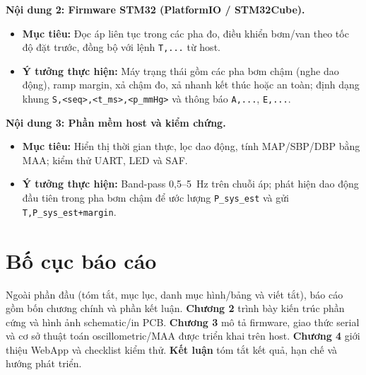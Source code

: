 \noindent\textbf{Nội dung 2: Firmware STM32 (PlatformIO / STM32Cube).}\\
\vspace{-0.6cm}
\begin{itemize}\itemsep0pt \parskip0pt 
	\item \textbf{Mục tiêu:} Đọc áp liên tục trong các pha đo, điều khiển bơm/van theo tốc độ đặt trước, đồng bộ với lệnh \texttt{T,...} từ host.
	\item \textbf{Ý tưởng thực hiện:} Máy trạng thái gồm các pha bơm chậm (nghe dao động), ramp margin, xả chậm đo, xả nhanh kết thúc hoặc an toàn; định dạng khung \texttt{S,<seq>,<t\_ms>,<p\_mmHg>} và thông báo \texttt{A,...}, \texttt{E,...}.
\end{itemize}
\vspace{-0.2cm}

\noindent\textbf{Nội dung 3: Phần mềm host và kiểm chứng.}\\
\vspace{-0.6cm}
\begin{itemize}\itemsep0pt \parskip0pt 
	\item \textbf{Mục tiêu:} Hiển thị thời gian thực, lọc dao động, tính MAP/SBP/DBP bằng MAA; kiểm thử UART, LED và SAF.
	\item \textbf{Ý tưởng thực hiện:} Band-pass 0{,}5--5~Hz trên chuỗi áp; phát hiện dao động đầu tiên trong pha bơm chậm để ước lượng \texttt{P\_sys\_est} và gửi \texttt{T,P\_sys\_est+margin}.
\end{itemize}

\section{Bố cục báo cáo}
Ngoài phần đầu (tóm tắt, mục lục, danh mục hình/bảng và viết tắt), báo cáo gồm bốn chương chính và phần kết luận. \textbf{Chương 2} trình bày kiến trúc phần cứng và hình ảnh schematic/in PCB. \textbf{Chương 3} mô tả firmware, giao thức serial và cơ sở thuật toán oscillometric/MAA được triển khai trên host. \textbf{Chương 4} giới thiệu WebApp và checklist kiểm thử. \textbf{Kết luận} tóm tắt kết quả, hạn chế và hướng phát triển.
